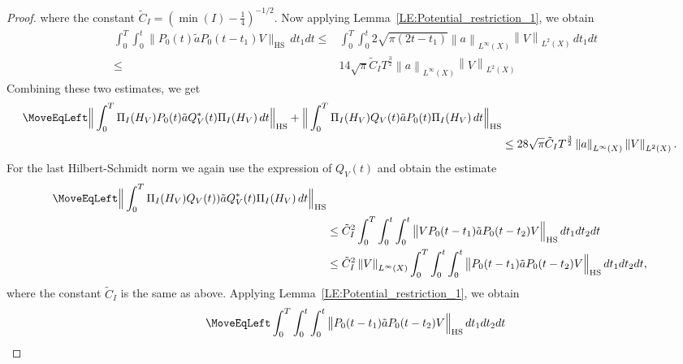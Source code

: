 \documentclass[11pt,twoside,reqno]{amsart}
\newcommand{\1}{\mathrm{\mathbf{1}}}
\newcommand{\bHS}{\mathrm{HS}}
\newcommand{\norm}[1]{\left\lVert#1\right\rVert}
\numberwithin{equation}{section}
\theoremstyle{plain}
\theoremstyle{definition}
\theoremstyle{remark}
\begin{document}
\begin{proof}
where the constant $\tilde{C}_I = (\min(I)-\frac14)^{-1/2}$. Now applying Lemma~\ref{LE:Potential_restriction_1}, we obtain
\begin{equation*}
    \begin{aligned}
     \int_0^T \int_{0}^{t}  \big\lVert P_0(t)  \tilde{a} P_0(t-t_1) V  \big\rVert_{\bHS}   \, d t_1 d t
     \leq{}&   \int_0^T \int_{0}^{t} 2 \sqrt{\pi(2t - t_1)} \norm{a}_{L^\infty(X)}\norm{V}_{L^2(X)}  \, d t_1 d t
     \\
     \leq {}&  14 \sqrt{\pi} \tilde{C}_I T^{\frac{3}{2}}  \norm{a}_{L^\infty(X)}\norm{V}_{L^2(X)} 
     \end{aligned}
\end{equation*}
Combining these two estimates, we get
\begin{equation}\label{EQ:Potential_restriction_2_3}
    \begin{aligned}
       \MoveEqLeft \Big\lVert \int_0^T \Pi_I(H_V) P_0(t)  \tilde{a} Q_V^*(t) \Pi_I(H_V) \, d t \Big\rVert_{\bHS} 
       +
       \Big\lVert \int_0^T \Pi_I(H_V) Q_V(t) \tilde{a} P_0(t)  \Pi_I(H_V) \, d t \Big\rVert_{\bHS} 
       \\
       &\leq  28\sqrt{\pi} \tilde{C}_I T^{\frac{3}{2}}  \norm{a}_{L^\infty(X)}\norm{V}_{L^2(X)}. 
    \end{aligned}
\end{equation}
For the last Hilbert-Schmidt norm we again use the expression of $Q_V(t)$ and obtain the estimate
\begin{equation*}
    \begin{aligned}
       \MoveEqLeft \Big\lVert \int_0^T \Pi_I(H_V) Q_V(t))\tilde{a} Q_V^*(t) \Pi_I(H_V) \, d t \Big\rVert_{\bHS}
      \\
      &\leq \tilde{C}_I^2 \int_0^T \int_{0}^t \int_{0}^t  \big\lVert  VP_0(t-t_1)\tilde{a} P_0(t-t_2) V   \Big\rVert_{\bHS} \, d t_1  d t_2  d t 
      \\
      &\leq \tilde{C}_I^2 \norm{V}_{L^\infty(X)} \int_0^T \int_{0}^t \int_{0}^t  \big\lVert P_0(t-t_1)\tilde{a}P_0(t-t_2) V   \Big\rVert_{\bHS} \, d t_1  d t_2  d t, 
    \end{aligned}
\end{equation*}
where the constant $\tilde{C}_I$ is the same as above. Applying Lemma~\ref{LE:Potential_restriction_1}, we obtain 
\begin{equation*}
    \begin{aligned}
        \MoveEqLeft \int_0^T \int_{0}^t \int_{0}^t  \big\lVert P_0(t-t_1)\tilde{a}P_0(t-t_2) V   \Big\rVert_{\bHS} \, d t_1  d t_2  d t  

\end{aligned}
\end{equation*}
\end{proof}
\end{document}
